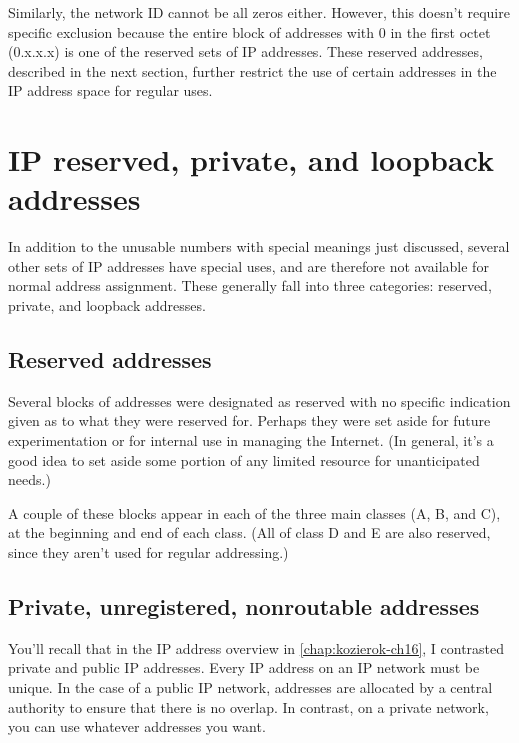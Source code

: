 \documentclass[b5paper,11pt]{memoir}
\begin{document}
Similarly, the network ID cannot be all zeros either. However, this
doesn't require specific exclusion because the entire block of addresses
with 0 in the first octet (0.x.x.x) is one of the reserved sets of
\protect\hypertarget{ch17s04.htmlux5cux23idx-CHP-17-0699}{}{}IP
addresses. These reserved addresses, described in the next section,
further restrict the use of certain addresses in the IP address space
for regular uses.



\section{IP reserved, private, and loopback addresses}

In addition to the unusable numbers with special meanings just
discussed, several other sets of IP addresses have special uses, and are
therefore not available for normal address assignment. These generally
fall into three categories: reserved, private, and loopback addresses.

\subsection{Reserved addresses}

Several blocks of addresses were designated as reserved with no specific
indication given as to what they were reserved for. Perhaps they were
set aside for future experimentation or for internal use in managing the
Internet. (In general, it's a good idea to set aside some portion of any
\protect\hypertarget{ch17s05.htmlux5cux23idx-CHP-17-0700}{}{}limited
resource for unanticipated needs.)

A couple of these blocks appear in each of the three main classes (A, B,
and C), at the beginning and end of each class. (All of class D and E
are also reserved, since they aren't used for regular addressing.)



\subsection{Private, unregistered, nonroutable addresses}

You'll recall that in the IP address overview in \vref{chap:kozierok-ch16}, I contrasted private and
public IP addresses. Every IP address on an IP network must be unique.
In the case of a public IP network, addresses are allocated by a central
authority to ensure that there is no overlap. In contrast, on a private
network, you can use whatever addresses you want.
\end{document}
